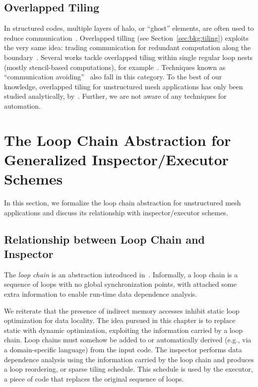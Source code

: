 \subsection*{Overlapped Tiling}
In structured codes, multiple layers of halo, or ``ghost'' elements, are often used to reduce communication~\citep{Bassetti98}. Overlapped tilling (see Section~\ref{sec:bkg:tiling}) exploits the very same idea: trading communication for redundant computation along the boundary~\citep{Zhou12}. Several works tackle overlapped tiling within single regular loop nests (mostly stencil-based computations), for example~\cite{Meng09,Krishnamoorthy07,Chen02}. Techniques known as ``communication avoiding''~\citep{ST-Demmel08,ST-commAvoidingSparse2009} also fall in this category. To the best of our knowledge, overlapped tiling for unstructured mesh applications has only been studied analytically, by~\cite{gihan-overlapped}. Further, we are not aware of any techniques for automation. 



\section{The Loop Chain Abstraction for Generalized Inspector/Executor Schemes}
\label{sec:tiling:lc}
In this section, we formalize the loop chain abstraction for unstructured mesh applications and discuss its relationship with inspector/executor schemes.

\subsection{Relationship between Loop Chain and Inspector}
The \textit{loop chain} is an abstraction introduced in~\cite{ST-KriegerHIPS2013}. Informally, a loop chain is a sequence of loops with no global synchronization points, with attached some extra information to enable run-time data dependence analysis. 

We reiterate that the presence of indirect memory accesses inhibit static loop optimization for data locality. The idea pursued in this chapter is to replace static with dynamic optimization, exploiting the information carried by a loop chain. Loop chains must somehow be added to or automatically derived (e.g., via a domain-specific language) from the input code. The inspector performs data dependence analysis using the information carried by the loop chain and produces a loop reordering, or sparse tiling schedule. This schedule is used by the executor, a piece of code that replaces the original sequence of loops.

